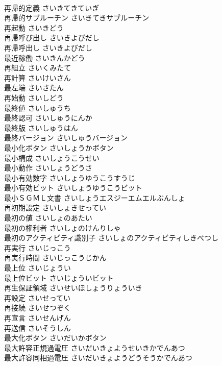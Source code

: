 \documentclass[8pt]{extreport}
\begin{document}
\begin{CJK}{UTF8}{min}
\\	再帰的定義	さいきてきていぎ	
\\	再帰的サブルーチン	さいきてきサブルーチン	
\\	再起動	さいきどう	
\\	再帰呼び出し	さいきよびだし	
\\	再帰呼出し	さいきよびだし	
\\	最近稼働	さいきんかどう	
\\	再組立	さいくみたて	
\\	再計算	さいけいさん	
\\	最左端	さいさたん	
\\	再始動	さいしどう	
\\	最終値	さいしゅうち	
\\	最終認可	さいしゅうにんか	
\\	最終版	さいしゅうはん	
\\	最終バージョン	さいしゅうバージョン	
\\	最小化ボタン	さいしょうかボタン	
\\	最小構成	さいしょうこうせい	
\\	最小動作	さいしょうどうさ	
\\	最小有効数字	さいしょうゆうこうすうじ	
\\	最小有効ビット	さいしょうゆうこうビット	
\\	最小ＳＧＭＬ文書	さいしょうエスジーエムエルぶんしょ	
\\	再初期設定	さいしょきせってい	
\\	最初の値	さいしょのあたい	
\\	最初の権利者	さいしょのけんりしゃ	
\\	最初のアクティビティ識別子	さいしょのアクティビティしきべつし	
\\	再実行	さいじっこう	
\\	再実行時間	さいじっこうじかん	
\\	最上位	さいじょうい	
\\	最上位ビット	さいじょういビット	
\\	再生保証領域	さいせいほしょうりょういき	
\\	再設定	さいせってい	
\\	再接続	さいせつぞく	
\\	再宣言	さいせんげん	
\\	再送信	さいそうしん	
\\	最大化ボタン	さいだいかボタン	
\\	最大許容正規過電圧	さいだいきょようせいきかでんあつ	
\\	最大許容同相過電圧	さいだいきょようどうそうかでんあつ	

\end{CJK}
\end{document}
